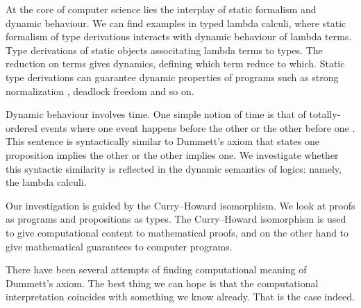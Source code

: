 



At the core of computer science lies the interplay of static formalism
and dynamic behaviour.  We can find examples in typed lambda calculi,
where static formalism of type derivations interacts with dynamic
behaviour of lambda terms.
Type derivations of static objects associtating lambda terms to types.
The reduction on terms gives dynamics, defining which term reduce
to which.  Static type derivations can guarantee dynamic properties of
programs such as strong normalization , deadlock freedom
and so on.

Dynamic behaviour involves time.
One simple notion of time is that of totally-ordered events where
one event happens before the other or the other before one .
This sentence is syntactically similar to Dummett's axiom that states
one proposition implies the other or the other implies one.
We investigate whether this syntactic similarity is reflected
in the dynamic semantics of logics: namely, the lambda calculi.


Our investigation is guided by the Curry--Howard isomorphism.
We look at proofs as programs and propositions as types.
The Curry--Howard isomorphism is used to give computational content
to mathematical proofs, and on the other hand to give mathematical
guarantees to computer programs.


There have been several attempts of finding computational meaning of
Dummett's axiom.  
The best thing we can hope is that the computational
interpretation coincides with something we know already.
That is the case indeed.

